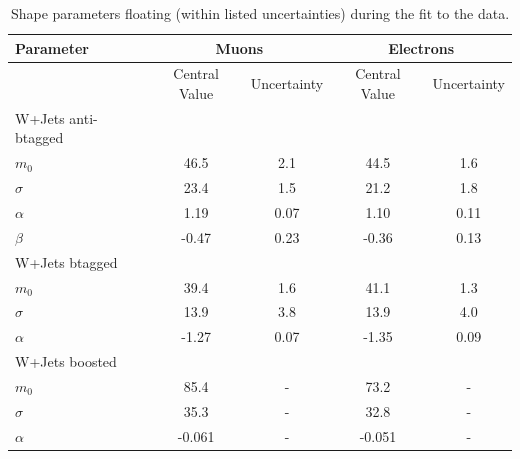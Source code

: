 \begin{table}[bthp]
\begin{center}
\caption{Shape parameters floating (within listed uncertainties) during the fit to the data.}
 \label{tab:FloatingShapePars}
\vspace{0.5cm}
 \begin{tabular} {l  c  c c c }
   \hline 
\hline
Parameter            &  \multicolumn{2}{c}{Muons} & \multicolumn{2}{c}{Electrons} \\  
\hline
               & Central Value &   Uncertainty     &  Central Value &  Uncertainty \\
\hline
W+Jets anti-btagged \\
\hline
$m_0$          &   46.5            &   2.1                 &   44.5             &  1.6            \\
$\sigma$       &   23.4            &   1.5                 &   21.2             &  1.8            \\
$\alpha$       &   1.19            &   0.07                &   1.10             &  0.11            \\
$\beta$        &  -0.47            &   0.23                &  -0.36             &  0.13            \\
\hline
W+Jets btagged \\
\hline
$m_0$          &   39.4            &   1.6                 &   41.1             &  1.3            \\
$\sigma$       &   13.9            &   3.8                 &   13.9             &  4.0            \\
$\alpha$       &  -1.27            &   0.07                &  -1.35             &  0.09            \\
\hline
W+Jets boosted \\
\hline
$m_0$          &   85.4            &   -                &   73.2             &  -            \\
$\sigma$       &   35.3            &   -                 &   32.8             &  -            \\
$\alpha$       &  -0.061           &   -               &  -0.051            & -            \\
\hline
\hline
\end{tabular}
\end{center}
\end{table}


